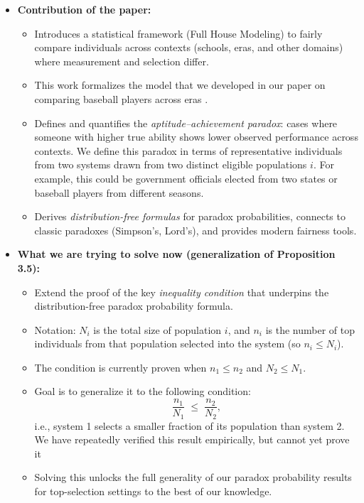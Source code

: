 \documentclass[12pt]{article}
\begin{document}
\begin{itemize}
    \item \textbf{Contribution of the paper:}
    \begin{itemize}
        \item Introduces a statistical framework (Full House Modeling) to fairly compare individuals across contexts (schools, eras, and other domains) where measurement and selection differ. 
        \item This work formalizes the model that we developed in our paper on comparing baseball players across eras \citep{yan2025comparing}.
        \item Defines and quantifies the \emph{aptitude--achievement paradox}: cases where someone with higher true ability shows lower observed performance across contexts. We define this paradox in terms of representative individuals from two systems drawn from two distinct eligible populations $i$. For example, this could be government officials elected from two states or baseball players from different seasons.
        \item Derives \emph{distribution-free formulas} for paradox probabilities, connects to classic paradoxes (Simpson's, Lord's), and provides modern fairness tools.
    \end{itemize}

    \item \textbf{What we are trying to solve now (generalization of Proposition 3.5):}
    \begin{itemize}
        \item Extend the proof of the key \emph{inequality condition} that underpins the distribution-free paradox probability formula.
        \item Notation: $N_i$ is the total size of population $i$, and $n_i$ is the number of top individuals from that population selected into the system (so $n_i \leq N_i$).
        \item The condition is currently proven when $n_1 \leq n_2$ and $N_2 \leq N_1$.
        \item Goal is to generalize it to the following condition:
        \[
            \frac{n_1}{N_1} \;\leq\; \frac{n_2}{N_2},
        \]
        i.e., system 1 selects a smaller fraction of its population than system 2. We have repeatedly verified this result empirically, but cannot yet prove it        
        \item Solving this unlocks the full generality of our paradox probability results for top-selection settings to the best of our knowledge.
    \end{itemize}
\end{itemize}
\end{document}
